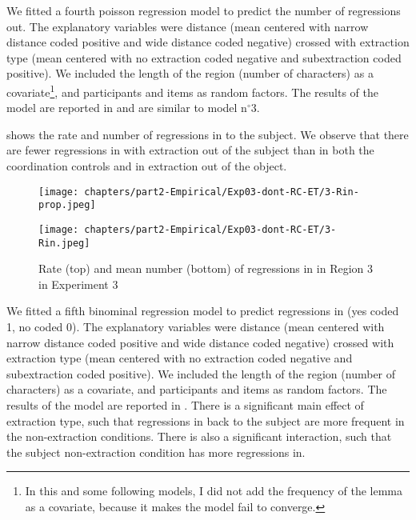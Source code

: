 

We fitted a fourth poisson regression model to predict the number of regressions out. The explanatory variables were distance (mean centered with narrow distance coded positive and wide distance coded negative) crossed with extraction type (mean centered with no extraction coded negative and subextraction coded positive). We included the length of the region (number of characters) as a covariate{\footnote{In this and some following models, I did not add the frequency of the lemma as a covariate, because it makes the model fail to converge.}}, and participants and items as random factors. 
The results of the model are reported in  and are similar to model n$^{\circ}$3.



 shows the rate and number of regressions in to the subject. We observe that there are fewer regressions in with extraction out of the subject than in both the coordination controls and in extraction out of the object. 

\begin{figure}
    \centering
    \texttt{[image: chapters/part2-Empirical/Exp03-dont-RC-ET/3-Rin-prop.jpeg]}
    
    \texttt{[image: chapters/part2-Empirical/Exp03-dont-RC-ET/3-Rin.jpeg]}
    \caption{Rate (top) and mean number (bottom) of regressions in in Region 3 in Experiment 3}
    \label{fig:exp03-3-Rin-prop}
\end{figure}

We fitted a fifth binominal regression model to predict regressions in (yes coded 1, no coded 0). The explanatory variables were distance (mean centered with narrow distance coded positive and wide distance coded negative) crossed with extraction type (mean centered with no extraction coded negative and subextraction coded positive). We included the length of the region (number of characters) as a covariate, and participants and items as random factors. 
The results of the model are reported in . There is a significant main effect of extraction type, such that regressions in back to the subject are more frequent in the non-extraction conditions. There is also a significant interaction, such that the subject non-extraction condition has more regressions in.\largerpage[1.5]

